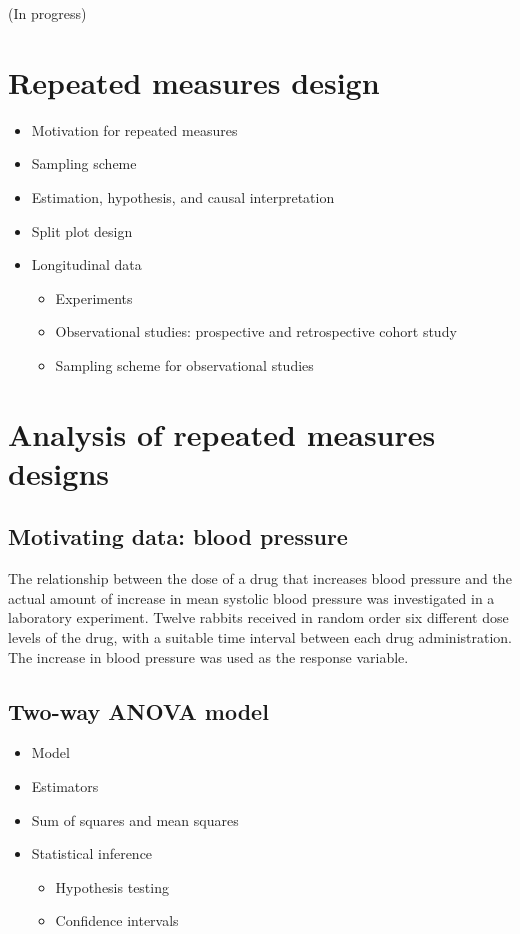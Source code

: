 \documentclass[12pt,]{book}
\providecommand{\tightlist}{%
  \setlength{\itemsep}{0pt}\setlength{\parskip}{0pt}}
\begin{document}
(In progress)

\section{Repeated measures design}\label{repeated-measures-design}

\begin{itemize}
\tightlist
\item
  Motivation for repeated measures
\item
  Sampling scheme
\item
  Estimation, hypothesis, and causal interpretation
\item
  Split plot design
\item
  Longitudinal data

  \begin{itemize}
  \tightlist
  \item
    Experiments
  \item
    Observational studies: prospective and retrospective cohort study
  \item
    Sampling scheme for observational studies
  \end{itemize}
\end{itemize}

\section{Analysis of repeated measures
designs}\label{analysis-of-repeated-measures-designs}

\subsection{Motivating data: blood
pressure}\label{motivating-data-blood-pressure}

The relationship between the dose of a drug that increases blood
pressure and the actual amount of increase in mean systolic blood
pressure was investigated in a laboratory experiment. Twelve rabbits
received in random order six different dose levels of the drug, with a
suitable time interval between each drug administration. The increase in
blood pressure was used as the response variable.

\subsection{Two-way ANOVA model}\label{two-way-anova-model}

\begin{itemize}
\tightlist
\item
  Model
\item
  Estimators
\item
  Sum of squares and mean squares
\item
  Statistical inference

  \begin{itemize}
  \tightlist
  \item
    Hypothesis testing
  \item
    Confidence intervals
  \end{itemize}
\end{itemize}
\end{document}
